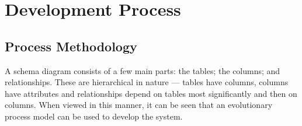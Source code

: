 \cleardoublepage
\chapter{Development Process}





\section{Process Methodology}
A schema diagram consists of a few main parts: the tables; the columns; and relationships. These are hierarchical in nature --- tables have columns, columns have attributes and relationships depend on tables most significantly and then on columns. When viewed in this manner, it can be seen that an evolutionary process model can be used to develop the system.


